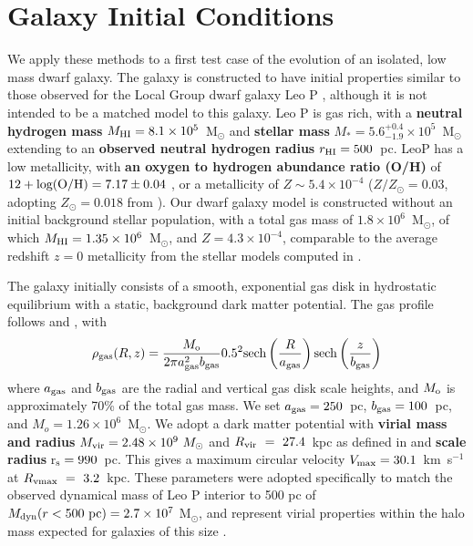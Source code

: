 \documentclass[fleqn,usenatbib,useAMS]{mnras}
\begin{document}
\section{Galaxy Initial Conditions}
\label{sec:IC}
We apply these methods to a first test case of the evolution of an isolated, low mass dwarf galaxy. The galaxy is constructed to have initial properties similar to those observed for the Local Group dwarf galaxy Leo P \citep{Giovanelli2013,McQuinn2013,McQuinn2015a,McQuinn2015}, although it is not intended to be a matched model to this galaxy. Leo P is gas rich, with a \textbf{neutral hydrogen mass} $M_{\rm HI} = 8.1\times 10^{5}$~M$_{\odot}$ and \textbf{stellar mass} $M_{*} = 5.6^{+0.4}_{-1.9} \times 10^{5}$~M$_{\odot}$ \citep{McQuinn2015a} extending to an \textbf{observed neutral hydrogen radius} $r_{\rm HI} = 500$~pc. LeoP has a low metallicity, with \textbf{an oxygen to hydrogen abundance ratio (O/H)} of $12 + \rm{log(O/H)} = 7.17 \pm 0.04$ \citep{Skillman2013}, or a metallicity of $Z \sim 5.4\times10^{-4}$ ($Z/Z_{\odot} = 0.03$, adopting $Z_{\odot} = 0.018$ from \citet{Asplund2009}). Our dwarf galaxy model is constructed without an initial background stellar population, with a total gas mass of $1.8 \times 10^{6}$~M$_{\odot}$, of which $M_{\rm HI} = 1.35 \times 10^{6}$~M$_{\odot}$, and $Z = 4.3\times 10^{-4}$, comparable to the average redshift $z = 0$ metallicity from the stellar models computed in \citet{McQuinn2015}.

The galaxy initially consists of a smooth, exponential gas disk in hydrostatic equilibrium with a static, background dark matter potential. The gas profile follows \citet{Tonnesen2009} and \citet{Salem2015}, with
\begin{equation}
\rho_{\rm gas} (R,z) = \frac{M_{\rm o}}{2\pi a^2_{\rm gas}b_{\rm gas}} 0.5^2{\rm sech}\left(\frac{R}{a_{\rm gas}}\right){\rm sech}\left(\frac{z}{b_{\rm gas}}\right)
\end{equation}
where $a_{\rm gas}$ and $b_{\rm gas}$ are the radial and vertical gas disk scale heights, and $M_{\rm o}$ is approximately 70\% of the total gas mass. We set $a_{\rm gas} = 250$~pc, $b_{\rm gas} = 100$~pc, and $M_o = 1.26\times 10^6$~M$_{\odot}$. We adopt a \citet{Burkert1995} dark matter potential with \textbf{virial mass and radius} $M_{\rm vir} = 2.48\times 10^{9}~M_{\odot}$ and $R_{\rm vir}~=~27.4$~kpc as defined in \citep{BryanNorman1998} and \textbf{scale radius} r$_{\rm s} = 990$~pc. This gives a maximum circular velocity $V_{\rm max} = 30.1$~km~s$^{-1}$ at $R_{\rm vmax}~=~3.2$~kpc. These parameters were adopted specifically to match the observed dynamical mass of Leo P interior to 500 pc of $M_{\rm dyn} (r < 500~\rm{pc}) = 2.7\times 10^{7}$ M$_{\odot}$, and represent virial properties within the halo mass expected for galaxies of this size \citep{Ferrero2012,Read2017}.
\end{document}
